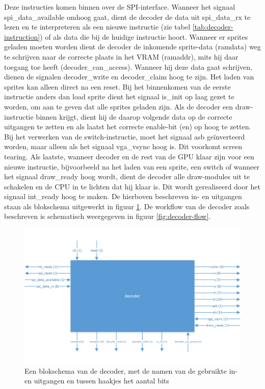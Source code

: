 \documentclass{scrartcl} %
\begin{document}
Deze instructies komen binnen over de SPI-interface. Wanneer het signaal spi\_data\_available omhoog gaat, dient de decoder de data uit spi\_data\_rx te lezen en te interpreteren als een nieuwe instructie (zie tabel \ref{tab:decoder-instruction}) of als data die bij de huidige instructie hoort.
Wanneer er sprites geladen moeten worden dient de decoder de inkomende sprite-data (ramdata) weg te schrijven naar de correcte plaats in het VRAM (ramaddr), mits hij daar toegang toe heeft (decoder\_can\_access). Wanneer hij deze data gaat schrijven, dienen de signalen decoder\_write en decoder\_claim hoog te zijn. Het laden van sprites kan alleen direct na een reset. Bij het binnenkomen van de eerste instructie anders dan load sprite dient het signaal is\_init op laag gezet te worden, om aan te geven dat alle sprites geladen zijn.
Als de decoder een draw-instructie binnen krijgt, dient hij de daarop volgende data op de correcte uitgangen te zetten en als laatst het correcte enable-bit (en) op hoog te zetten.
Bij het verwerken van de switch-instructie, moet het signaal asb geïnverteerd worden, maar alleen als het signaal vga\_vsync hoog is. Dit voorkomt screen tearing.
Als laatste, wanneer decoder en de rest van de GPU klaar zijn voor een nieuwe instructie, bijvoorbeeld na het laden van een sprite, een switch of wanneer het signaal draw\_ready hoog wordt, dient de decoder alle draw-modules uit te schakelen en de CPU in te lichten dat hij klaar is. Dit wordt gerealiseerd door het signaal int\_ready hoog te maken.
De hierboven beschreven in- en uitgangen staan als blokschema uitgewerkt in figuur \ref{fig:decoder-schema}. De workflow van de decoder zoals beschreven is schematisch weergegeven in figuur \ref{fig:decoder-flow}.

\begin{figure}[H]
	\centering
	\includegraphics[width=\textwidth]{resource/decoder.png}
	\caption{Een blokschema van de decoder, met de namen van de gebruikte in- en uitgangen en tussen haakjes het aantal bits}
	\label{fig:decoder-schema}
\end{figure}
\end{document}
